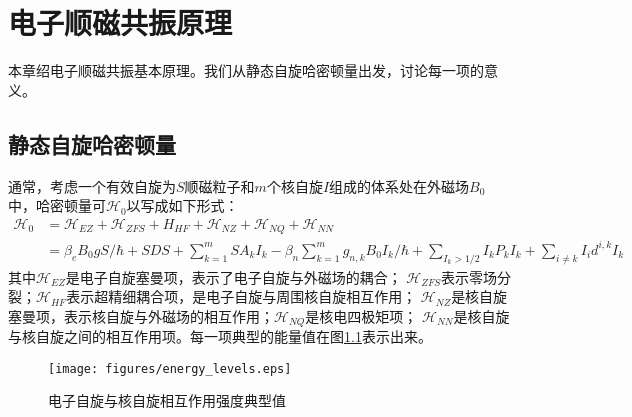 ﻿
\chapter{电子顺磁共振原理}
\label{chap:esr-theory}
本章绍电子顺磁共振基本原理。我们从静态自旋哈密顿量出发，讨论每一项的意义。

    \section{静态自旋哈密顿量}

    通常，考虑一个有效自旋为$S$顺磁粒子和$m$个核自旋$I$组成的体系处在外磁场$B_0$中，哈密顿量可$\mathcal{H}_0$以写成如下形式\cite{static-spin-H}：
        \begin{equation}
            \begin{split}
            \label{H0}
            \mathcal{H}_0   &= \mathcal{H}_{EZ} + \mathcal{H}_{ZFS} + H_{HF} + \mathcal{H}_{NZ} +　\mathcal{H}_{NQ} + \mathcal{H}_{NN}\\
                            &= \beta_e B_0 g S/\hbar + S D S + \sum\limits_{k=1}^m S A_k I_k - \beta_n \sum\limits_{k = 1}^m g_{n,k} B_0 I_k/\hbar + \sum\limits_{I_k > 1/2} I_k P_k I_k
                                + \sum\limits_{i\neq k}I_i d^{i,k}I_k
            \end{split}
        \end{equation}
    其中$\mathcal{H}_{EZ}$是电子自旋塞曼项，表示了电子自旋与外磁场的耦合； $\mathcal{H}_{ZFS}$表示零场分裂；$\mathcal{H}_{HF}$表示超精细耦合项，是电子自旋与周围核自旋相互作用；
    $\mathcal{H}_{NZ}$是核自旋塞曼项，表示核自旋与外磁场的相互作用；$\mathcal{H}_{NQ}$是核电四极矩项；
    $\mathcal{H}_{NN}$是核自旋与核自旋之间的相互作用项。每一项典型的能量值在图\ref{energy_levels}表示出来\cite{Schweiger_principles}。

        \begin{figure}[htbp]
            \begin{center}
              \texttt{[image: figures/energy\_levels.eps]}
              \caption{电子自旋与核自旋相互作用强度典型值
              }
              \label{energy_levels}
        \end{center}
        \end{figure}


